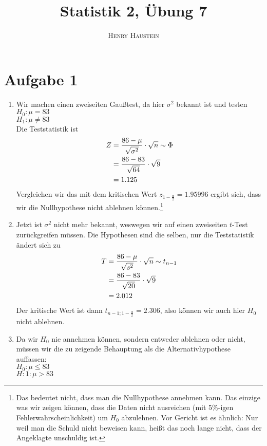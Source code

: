 \documentclass{article}
\title{\textbf{Statistik 2, Übung 7}}
\author{\textsc{Henry Haustein}}
\date{}
\begin{document}
	\maketitle
	
	\section*{Aufgabe 1}
	\begin{enumerate}[label=(\alph*)]
		\item Wir machen einen zweiseiten Gaußtest, da hier $\sigma^2$ bekannt ist und testen \\
		$H_0:\mu=83$ \\
		$H_1:\mu\neq 83$ \\
		Die Teststatistik ist
		\begin{align}
			Z &= \frac{86-\mu}{\sqrt{\sigma^2}}\cdot\sqrt{n} \sim\Phi \notag \\
			&= \frac{86-83}{\sqrt{64}}\cdot\sqrt{9} \notag \\
			&= 1.125 \notag
		\end{align}
		Vergleichen wir das mit dem kritischen Wert $z_{1-\frac{\alpha}{2}}=1.95996$ ergibt sich, dass wir die Nullhypothese nicht ablehnen können.\footnote{Das bedeutet nicht, dass man die Nullhypothese annehmen kann. Das einzige was wir zeigen können, dass die Daten nicht ausreichen (mit 5\%-igen Fehlerwahrscheinlichkeit) um $H_0$ abzulehnen. Vor Gericht ist es ähnlich: Nur weil man die Schuld nicht beweisen kann, heißt das noch lange nicht, dass der Angeklagte unschuldig ist.}
		\item Jetzt ist $\sigma^2$ nicht mehr bekannt, weswegen wir auf einen zweiseiten $t$-Test zurückgreifen müssen. Die Hypothesen sind die selben, nur die Teststatistik ändert sich zu
		\begin{align}
			T &= \frac{86-\mu}{\sqrt{s^2}}\cdot\sqrt{n}\sim t_{n-1} \notag \\
			&= \frac{86-83}{\sqrt{20}}\cdot\sqrt{9} \notag \\
			&= 2.012 \notag
		\end{align}
		Der kritische Wert ist dann $t_{n-1;1-\frac{\alpha}{2}}=2.306$, also können wir auch hier $H_0$ nicht ablehnen.
		\item Da wir $H_0$ nie annehmen können, sondern entweder ablehnen oder nicht, müssen wir die zu zeigende Behauptung als die Alternativhypothese auffassen: \\
		$H_0: \mu\le 83$ \\
		$H:1: \mu > 83$ \\

\end{enumerate}
\end{document}

